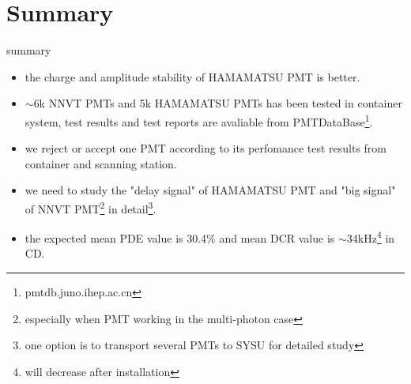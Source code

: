 \documentclass[11pt,compress,xcolor=x11names,UTF8]{beamer}
\begin{document}
\section{Summary}

\begin{frame}{summary}
\begin{itemize}
\item  the charge and amplitude stability of HAMAMATSU PMT is better.
\item  $\sim$6k NNVT PMTs and 5k HAMAMATSU PMTs has been tested in container system, test results and test reports are avaliable from PMTDataBase\footnote{pmtdb.juno.ihep.ac.cn}.
\item we reject or accept one PMT according to its perfomance test results from container and scanning station.
\item  {\color{red}we need to study the "delay signal" of HAMAMATSU PMT and "big signal" of NNVT PMT\footnote{especially when PMT working in the multi-photon case}} in detail\footnote{one option is to transport several PMTs to SYSU for detailed study}.
\item the expected mean PDE value is 30.4\% and mean DCR value is $\sim$34kHz\footnote{will decrease after installation} in CD.
\end{itemize}
\end{frame}

\begin{frame}
\end{frame}

\begin{frame}
\end{frame}

\end{document}

